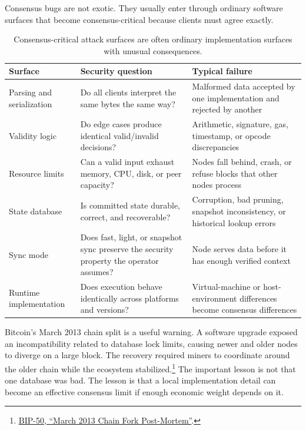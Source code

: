 Consensus bugs are not exotic. They usually enter through ordinary software surfaces that become consensus-critical because clients must agree exactly.

\begin{table}[htbp]
\centering
\small
\renewcommand{\arraystretch}{1.15}
\begin{tabularx}{\textwidth}{@{}>{\RaggedRight\arraybackslash}p{}>{\RaggedRight\arraybackslash}p{}X@{}}
\toprule
Surface & Security question & Typical failure \\
\midrule
Parsing and serialization & Do all clients interpret the same bytes the same way? & Malformed data accepted by one implementation and rejected by another \\
Validity logic & Do edge cases produce identical valid/invalid decisions? & Arithmetic, signature, gas, timestamp, or opcode discrepancies \\
Resource limits & Can a valid input exhaust memory, CPU, disk, or peer capacity? & Nodes fall behind, crash, or refuse blocks that other nodes process \\
State database & Is committed state durable, correct, and recoverable? & Corruption, bad pruning, snapshot inconsistency, or historical lookup errors \\
Sync mode & Does fast, light, or snapshot sync preserve the security property the operator assumes? & Node serves data before it has enough verified context \\
Runtime implementation & Does execution behave identically across platforms and versions? & Virtual-machine or host-environment differences become consensus differences \\
\bottomrule
\end{tabularx}
\caption{Consensus-critical attack surfaces are often ordinary implementation surfaces with unusual consequences.}
\end{table}

Bitcoin's March 2013 chain split is a useful warning. A software upgrade exposed an incompatibility related to database lock limits, causing newer and older nodes to diverge on a large block. The recovery required miners to coordinate around the older chain while the ecosystem stabilized.\footnote{\href{https://bips.dev/50/}{BIP-50, ``March 2013 Chain Fork Post-Mortem''}.} The important lesson is not that one database was bad. The lesson is that a local implementation detail can become an effective consensus limit if enough economic weight depends on it.

